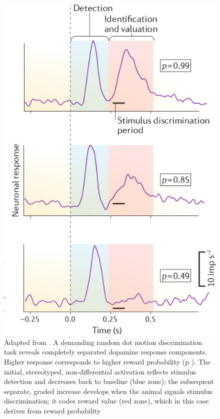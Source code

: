  \begin{figure}
    \centering
    \includegraphics[scale=0.4]{figures/ResponseProbSchultz.png}
    \caption{Adapted from \cite{Schultz2016}. A demanding random dot motion discrimination task reveals completely separated dopamine response components. Higher response corresponds to higher reward probability (p ). The initial, stereotyped, non-differential activation reflects stimulus detection and decreases back to baseline (blue zone); the subsequent separate, graded increase develops when the animal signals stimulus discrimination; it codes reward value (red zone), which in this case derives from reward probability}
    \label{fig:probSchultz}
\end{figure}
